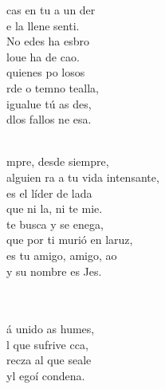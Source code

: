 \documentclass[12pt]{article}
\begin{document}
\begin{multicols*}{2}
\begin{cancion}%
	cas en tu a un der \\
	e la llene senti.\\
	No edes ha esbro\\
	loue ha de  cao.\\
	quienes po losos  \\
	rde o temno tealla,\\
	igualue tú as des,\\
	dlos fallos ne esa.\\\jump\\
	\begin{chorus}%
	mpre, desde siempre,\\
	alguien ra a tu vida intensante,\\
	es el líder de lada\\
	que ni la, ni te mie.\\
	 te busca y se enega,\\
	que por ti murió en laruz,\\
	es tu amigo, amigo, ao\\
	y su nombre es Jes.\\
	\end{chorus}%
	\jump\\
	      \\
	á unido as humes, \\
	l que sufrive cca,\\
	recza al que seale\\
	yl egoí condena.\\

\end{cancion}
\end{multicols*}
\end{document}
